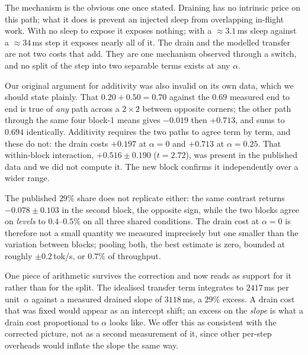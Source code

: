 \documentclass[manuscript,anonymous,review]{acmart}
\begin{document}
The mechanism is the obvious one once stated. Draining has no intrinsic
price on this path; what it does is prevent an injected sleep from
overlapping in-flight work. With no sleep to expose it exposes nothing;
with a ${\approx}3.1$\,ms sleep against a ${\approx}34$\,ms step it
exposes nearly all of it. The drain and the modelled transfer are not
two costs that add. They are one mechanism observed through a switch,
and no split of the step into two separable terms exists at any
$\alpha$.

Our original argument for additivity was also invalid on its own data,
which we should state plainly. That $0.20 + 0.50 = 0.70$ against the
$0.69$ measured end to end is true of \emph{any} path across a
$2 \times 2$ between opposite corners; the other path through the same
four block-1 means gives $-0.019$ then $+0.713$, and sums to $0.694$
identically. Additivity requires the two paths to agree term by term,
and these do not: the drain costs $+0.197$ at $\alpha = 0$ and $+0.713$
at $\alpha = 0.25$. That within-block interaction, $+0.516 \pm 0.190$
($t = 2.72$), was present in the published data and we did not compute
it. The new block confirms it independently over a wider range.

The published $29\%$ share does not replicate either: the same contrast
returns $-0.078 \pm 0.103$ in the second block, the opposite sign,
while the two blocks agree on \emph{levels} to $0.4$--$0.5\%$ on all
three shared conditions. The drain cost at $\alpha = 0$ is therefore
not a small quantity we measured imprecisely but one smaller than the
variation between blocks; pooling both, the best estimate is zero,
bounded at roughly $\pm 0.2$\,tok/s, or $0.7\%$ of throughput.

One piece of arithmetic survives the correction and now reads as
support for it rather than for the split. The idealised transfer term
integrates to $2417$\,ms per unit~$\alpha$ against a measured drained
slope of $3118$\,ms, a $29\%$ excess. A drain cost that was fixed would
appear as an intercept shift; an excess on the \emph{slope} is what a
drain cost proportional to $\alpha$ looks like. We offer this as
consistent with the corrected picture, not as a second measurement of
it, since other per-step overheads would inflate the slope the same
way.
\end{document}
